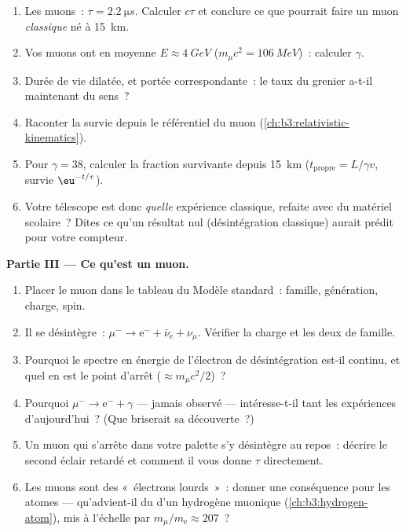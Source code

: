 \begin{problem}
\begin{enumerate}[resume]
  \item Les muons~: $\tau = \qty{2.2}{\micro s}$. Calculer $c\tau$
        et conclure ce que pourrait faire un muon \emph{classique}
        né à \qty{15}{km}.
  \item Vos muons ont en moyenne $E \approx \qty{4}{GeV}$
        ($m_\mu c^2 = \qty{106}{MeV}$)~: calculer $\gamma$.
  \item Durée de vie dilatée, et portée correspondante~: le taux
        du grenier a-t-il maintenant du sens~?
  \item Raconter la survie depuis le référentiel du muon
        (\cref{ch:b3:relativistic-kinematics}).
  \item Pour $\gamma = 38$, calculer la fraction survivante depuis
        \qty{15}{km} ($t_{\text{propre}} = L/\gamma v$, survie
        $\eu^{-t/\tau}$).
  \item Votre télescope est donc \emph{quelle} expérience
        classique, refaite avec du matériel scolaire~? Dites ce
        qu'un résultat nul (désintégration classique) aurait prédit
        pour votre compteur.
\end{enumerate}

\medskip\noindent\textbf{Partie III --- Ce qu'est un muon.}

\begin{enumerate}[resume]
  \item Placer le muon dans le tableau du Modèle standard~:
        famille, génération, charge, spin.
  \item Il se désintègre~: $\mu^- \to \text{e}^- + \bar\nu_{\text{e}} +
        \nu_\mu$. Vérifier la charge et les deux 
        de famille.
  \item Pourquoi le spectre en énergie de l'électron de
        désintégration est-il continu, et quel en est le point
        d'arrêt ($\approx m_\mu c^2/2$)~?
  \item Pourquoi $\mu^- \to \text{e}^- + \gamma$ --- jamais
        observé --- intéresse-t-il tant les expériences
        d'aujourd'hui~? (Que briserait sa découverte~?)
  \item Un muon qui s'arrête dans votre palette s'y désintègre au
        repos~: décrire le second éclair retardé et comment il
        vous donne $\tau$ directement.
  \item Les muons sont des «~électrons lourds~»~: donner une
        conséquence pour les atomes --- qu'advient-il du  d'un hydrogène muonique (\cref{ch:b3:hydrogen-atom}),
        mis à l'échelle par $m_\mu/m_{\text{e}} \approx 207$~?
\end{enumerate}


\end{problem}
